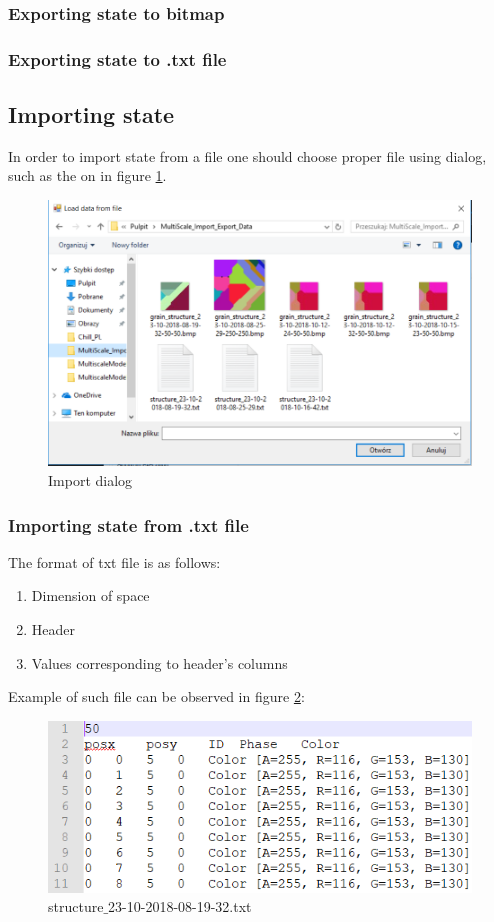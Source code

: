 \documentclass[a4paper, 11pt]{article}
\begin{document}
\subsubsection{Exporting state to bitmap}
\subsubsection{Exporting state to .txt file}

\subsection{Importing state}
In order to import state from a file one should choose proper file using dialog, such as the on in figure \ref{ImportLabel}.
\begin{figure}[H]
\centering
  \includegraphics[width=\linewidth]{ImportFrom}
  \caption{Import dialog}
  \label{ImportLabel}
\end{figure}

\subsubsection{Importing state from .txt file}
The format of txt file is as follows:
\begin{enumerate}
\item Dimension of space
\item Header
\item Values corresponding to header's columns
\end{enumerate}
Example of such file can be observed in figure \ref{ExportedTxtLabel}:
\begin{figure}[H]
\centering
  \includegraphics[]{ExportedTxt}
  \caption{structure$\_$23-10-2018-08-19-32.txt}
  \label{ExportedTxtLabel}
\end{figure}
\end{document}
